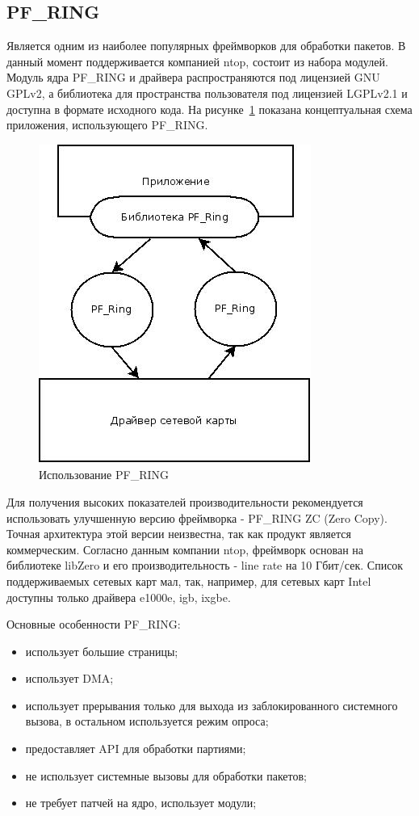 \subsection{{PF\_RING}}
Является одним из наиболее популярных фреймворков для обработки пакетов. В данный момент поддерживается компанией ntop, состоит из набора модулей. Модуль ядра PF\_RING и драйвера распространяются под лицензией GNU GPLv2, а библиотека для пространства пользователя под лицензией LGPLv2.1 и доступна в формате исходного кода. На рисунке~\ref{pic:pfring_example} показана концептуальная схема приложения, использующего PF\_RING.
\begin{figure}[h]
\centering
\includegraphics[scale=0.7]{pictures/pfring_example}
\caption{Использование PF\_RING}
\label{pic:pfring_example}
\end{figure}

Для получения высоких показателей производительности рекомендуется использовать улучшенную версию фреймворка - PF\_RING ZC (Zero Copy). Точная архитектура этой версии неизвестна, так как продукт является коммерческим. Согласно данным компании ntop, фреймворк основан на библиотеке libZero и его производительность - line rate на 10 Гбит/сек. Список поддерживаемых сетевых карт мал, так, например, для сетевых карт Intel доступны только драйвера e1000e, igb, ixgbe.

Основные особенности PF\_RING:
\begin{itemize}
\item использует большие страницы;
\item использует DMA;
\item использует прерывания только для выхода из заблокированного системного вызова, в остальном используется режим опроса;
\item предоставляет API для обработки партиями;
\item не использует системные вызовы для обработки пакетов;
\item не требует патчей на ядро, использует модули;
\end{itemize}

